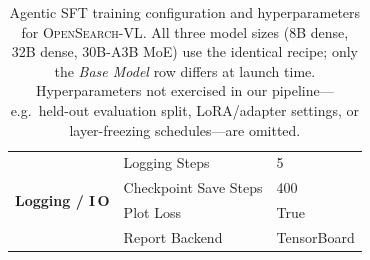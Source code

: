 \begin{table}[!tbp]
\begin{tabular}{@{}l l p{}@{}}
\midrule
\multirow{4}{*}{\textbf{Logging / I\,O}}
& Logging Steps & 5 \\
& Checkpoint Save Steps & 400 \\
& Plot Loss & True \\
& Report Backend & TensorBoard \\
\bottomrule
\end{tabular}
\caption{Agentic SFT training configuration and hyperparameters for \textsc{OpenSearch-VL}. All three model sizes (8B dense, 32B dense, 30B-A3B MoE) use the identical recipe; only the \emph{Base Model} row differs at launch time. Hyperparameters not exercised in our pipeline---e.g.\ held-out evaluation split, LoRA/adapter settings, or layer-freezing schedules---are omitted.}
\label{tab:sft-config}
\end{table}
